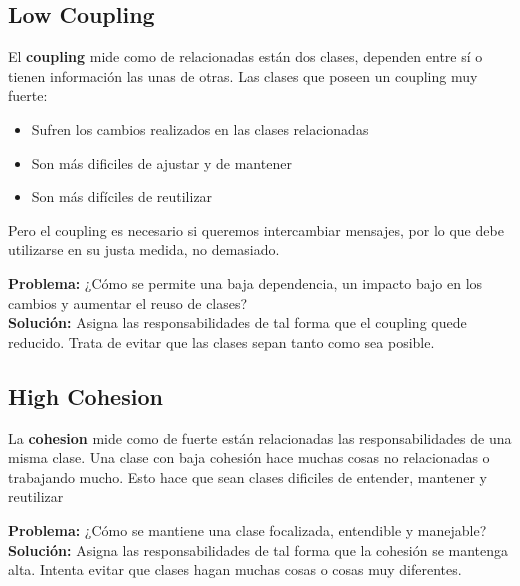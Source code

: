 \documentclass[11pt]{article}
\theoremstyle{plain}
\begin{document}
        \subsection{Low Coupling} %
        \label{sub:low_coupling}
            El \textbf{coupling} mide como de relacionadas están dos clases, dependen entre sí o tienen información las unas de otras. Las clases que poseen un coupling muy fuerte:
            \begin{itemize}
                \item Sufren los cambios realizados en las clases relacionadas
                \item Son más dificiles de ajustar y de mantener
                \item Son más difíciles de reutilizar
            \end{itemize}
            Pero el coupling es necesario si queremos intercambiar mensajes, por lo que debe utilizarse en su justa medida, no demasiado.
            \begin{center}
                \textbf{Problema:} ¿Cómo se permite una baja dependencia, un impacto bajo en los cambios y aumentar el reuso de clases?\\
                \textbf{Solución:} Asigna las responsabilidades de tal forma que el coupling quede reducido. Trata de evitar que las clases sepan tanto como sea posible.
            \end{center}
        \subsection{High Cohesion} %
        \label{sub:high_cohesion}
            La \textbf{cohesion} mide como de fuerte están relacionadas las responsabilidades de una misma clase. Una clase con baja cohesión hace muchas cosas no relacionadas o trabajando mucho. Esto hace que sean clases dificiles de entender, mantener y reutilizar
            \begin{center}
                \textbf{Problema:} ¿Cómo se mantiene una clase focalizada, entendible y manejable?\\
                \textbf{Solución:} Asigna las responsabilidades de tal forma que la cohesión se mantenga alta. Intenta evitar que clases hagan muchas cosas o cosas muy diferentes.
            \end{center}
              
\end{document}
